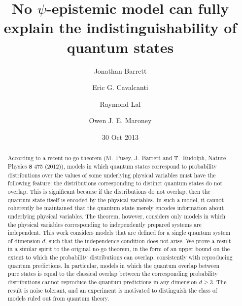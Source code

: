 \documentclass[prl,onecolumn,superscriptaddress,12pt]{revtex4-2}
\theoremstyle{remark}
\theoremstyle{definition}
\begin{document}
\title{No $\psi$-epistemic model can fully explain the indistinguishability of quantum states}
\author{Jonathan Barrett}
\author{Eric G. Cavalcanti}
\author{Raymond Lal}
\author{Owen J. E. Maroney}
\date{30 Oct 2013 }

\begin{abstract}

According to a recent no-go theorem (M.~Pusey, J.~Barrett and T.~Rudolph, Nature Physics {\bf 8} 475 (2012)), models in which quantum states correspond to probability distributions over the values of some underlying physical variables must have the following feature: the distributions corresponding to distinct quantum states do not overlap. This is significant because if the distributions do not overlap, then the quantum state itself is encoded by the physical variables. In such a model, it cannot coherently be maintained that the quantum state merely encodes information about underlying physical variables. The theorem, however, considers only models in which the physical variables corresponding to independently prepared systems are independent. This work considers models that are defined for a single quantum system of dimension $d$, such that the independence condition does not arise. We prove a result in a similar spirit to the original no-go theorem, in the form of an upper bound on the extent to which the probability distributions can overlap, consistently with reproducing quantum predictions. In particular, models in which the quantum overlap between pure states is equal to the classical overlap between the corresponding probability distributions cannot reproduce the quantum predictions in any dimension $d \geq 3$. The result is noise tolerant, and an experiment is motivated to distinguish the class of models ruled out from quantum theory.
\end{abstract}
\maketitle



%


\newpage

\appendix*


\end{document}
